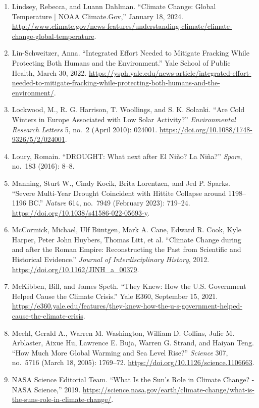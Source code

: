 \documentclass[12pt]{article}
\begin{document}
\begin{enumerate}[leftmargin=*]
\item Lindsey, Rebecca, and Luann Dahlman. ``Climate Change: Global Temperature | NOAA Climate.Gov,'' January 18, 2024. \url{http://www.climate.gov/news-features/understanding-climate/climate-change-global-temperature}.
\item Lin-Schweitzer, Anna. ``Integrated Effort Needed to Mitigate Fracking While Protecting Both Humans and the Environment.'' Yale School of Public Health, March 30, 2022. \url{https://ysph.yale.edu/news-article/integrated-effort-needed-to-mitigate-fracking-while-protecting-both-humans-and-the-environment/}.
\item Lockwood, M., R. G. Harrison, T. Woollings, and S. K. Solanki. ``Are Cold Winters in Europe Associated with Low Solar Activity?'' \textit{Environmental Research Letters} 5, no.\ 2 (April 2010): 024001. \url{https://doi.org/10.1088/1748-9326/5/2/024001}.
\item Loury, Romain. ``DROUGHT: What next after El Niño? La Niña?'' \textit{Spore}, no.\ 183 (2016): 8--8.
\item Manning, Sturt W., Cindy Kocik, Brita Lorentzen, and Jed P. Sparks. ``Severe Multi-Year Drought Coincident with Hittite Collapse around 1198--1196 BC.'' \textit{Nature} 614, no.\ 7949 (February 2023): 719--24. \url{https://doi.org/10.1038/s41586-022-05693-y}.
\item McCormick, Michael, Ulf Büntgen, Mark A. Cane, Edward R. Cook, Kyle Harper, Peter John Huybers, Thomas Litt, et al. ``Climate Change during and after the Roman Empire: Reconstructing the Past from Scientific and Historical Evidence.'' \textit{Journal of Interdisciplinary History}, 2012. \url{https://doi.org/10.1162/JINH_a_00379}.
\item McKibben, Bill, and James Speth. ``They Knew: How the U.S. Government Helped Cause the Climate Crisis.'' Yale E360, September 15, 2021. \url{https://e360.yale.edu/features/they-knew-how-the-u-s-government-helped-cause-the-climate-crisis}.
\item Meehl, Gerald A., Warren M. Washington, William D. Collins, Julie M. Arblaster, Aixue Hu, Lawrence E. Buja, Warren G. Strand, and Haiyan Teng. ``How Much More Global Warming and Sea Level Rise?'' \textit{Science} 307, no.\ 5716 (March 18, 2005): 1769--72. \url{https://doi.org/10.1126/science.1106663}.
\item NASA Science Editorial Team. ``What Is the Sun’s Role in Climate Change? - NASA Science,'' 2019. \url{https://science.nasa.gov/earth/climate-change/what-is-the-suns-role-in-climate-change/}.

\end{enumerate}
\end{document}
